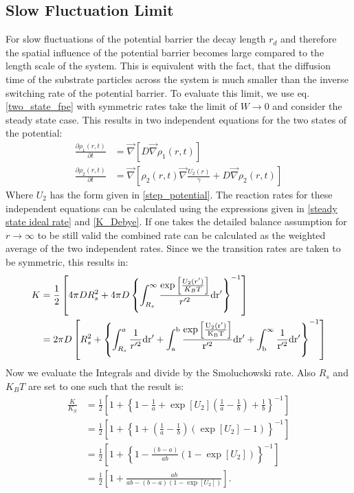 \subsection{Slow Fluctuation Limit}
For slow fluctuations of the potential barrier the decay length $r_d$ and therefore the spatial influence of the potential barrier becomes large compared to the length scale of the system. This is equivalent with the fact, that the diffusion time of the substrate particles across the system is much smaller than the inverse switching rate of the potential barrier. 
To evaluate this limit, we use eq. \eqref{two_state_fpe} with symmetric rates take the limit of $W \rightarrow 0$ and consider the steady state case.
This results in two independent equations for the two states of the potential:
\begin{align}
    \frac{\partial \rho_1(r,t)}{\partial t} &= \vec \nabla \left[ D \vec \nabla \rho_1(r,t) \right] \\ \nonumber
    \frac{\partial \rho_2(r,t)}{\partial t} &= \vec \nabla \left[\rho_2(r,t) \vec \nabla \frac{U_2(r)}{\gamma} + D \vec \nabla \rho_2(r,t) \right]
    \label{two_state_fpe_W_to_0}
\end{align}
Where $U_2$ has the form given in \eqref{step_potential}.
The reaction rates for these independent equations can be calculated using the expressions given in \eqref{steady state ideal rate} and \eqref{K_Debye}. If one takes the detailed balance assumption for $r \rightarrow \infty$ to be still valid the combined rate can be calculated as the weighted average of the two independent rates. Since we the transition rates are taken to be symmetric, this results in:
\begin{align}
    K &= \frac{1}{2} \left[ 4 \pi D R_s^2 + 4 \pi D  \left\{\int_{R_s}^{\infty} \frac{\exp \left[ \frac{U_2(r')}{K_B T}\right]}{r'^2} \rm d r' \right\}^{-1} \right] \\ \nonumber
    &= 2 \pi D \left[ R_s^2 +\left\{\int_{R_s}^{a} \frac{1}{r'^2} \rm d r' + \int_{a}^{b} \frac{\exp \left[ \frac{U_2(r')}{K_B T}\right]}{r'^2} \rm d r' + \int_{b}^{\infty} \frac{1}{r'^2} \rm d r' \right\}^{-1} \right]
\end{align}
Now we evaluate the Integrals and divide by the Smoluchowski rate. Also $R_s$ and $K_B T $ are set to one such that the result is:
\begin{align}
    \frac{K}{K_{S}} &= \frac{1}{2} \left[1 + \left\{ 1 -\frac{1}{a} + \exp[U_2] \left(\frac{1}{a} - \frac{1}{b}  \right) + \frac{1}{b} \right\}^{-1} \right] \nonumber \\
    &= \frac{1}{2}\left[ 1 + \left\{ 1 + \left( \frac{1}{a} - \frac{1}{b} \right)\left( \exp[U_2] -1 \right) \right\}^{-1} \right] \nonumber \\
    &= \frac{1}{2} \left[ 1 + \left\{ 1 - \frac{(b - a)}{ab}\left(1 - \exp[U_2] \right) \right\}^{-1} \right] \nonumber \\
    &= \frac{1}{2} \left[ 1 + \frac{ab}{ab - \left( b-a \right)\left(1 - \exp[U_2] \right)} \right].
    \label{two_state_K_slow}
\end{align}
